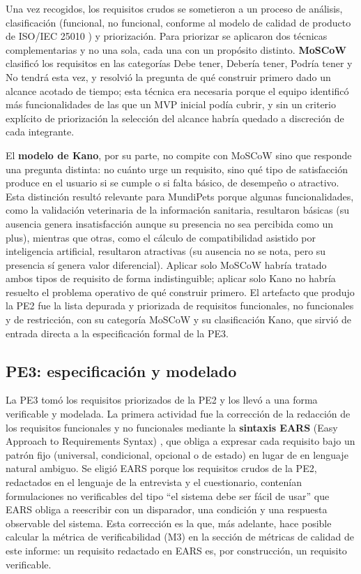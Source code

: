\documentclass[journal,onecolumn]{IEEEtran}
\begin{document}
	Una vez recogidos, los requisitos crudos se sometieron a un proceso de análisis,
	clasificación (funcional, no funcional, conforme al modelo de calidad de producto de
	ISO/IEC 25010 \cite{iso25010}) y priorización. Para priorizar se aplicaron dos técnicas
	complementarias y no una sola, cada una con un propósito distinto. \textbf{MoSCoW}
	clasificó los requisitos en las categorías Debe tener, Debería tener, Podría tener y No
	tendrá esta vez, y resolvió la pregunta de qué construir primero dado un alcance acotado de
	tiempo; esta técnica era necesaria porque el equipo identificó más funcionalidades de las
	que un MVP inicial podía cubrir, y sin un criterio explícito de priorización la selección
	del alcance habría quedado a discreción de cada integrante. 
	
	El \textbf{modelo de Kano}, por
	su parte, no compite con MoSCoW sino que responde una pregunta distinta: no cuánto urge un
	requisito, sino qué tipo de satisfacción produce en el usuario si se cumple o si falta
	básico, de desempeño o atractivo. Esta distinción resultó relevante para MundiPets
	porque algunas funcionalidades, como la validación veterinaria de la información sanitaria,
	resultaron básicas (su ausencia genera insatisfacción aunque su presencia no sea percibida
	como un plus), mientras que otras, como el cálculo de compatibilidad asistido por
	inteligencia artificial, resultaron atractivas (su ausencia no se nota, pero su presencia
	sí genera valor diferencial). Aplicar solo MoSCoW habría tratado ambos tipos de requisito
	de forma indistinguible; aplicar solo Kano no habría resuelto el problema operativo de
	qué construir primero. El artefacto que produjo la PE2 fue la lista depurada y priorizada
	de requisitos funcionales, no funcionales y de restricción, con su categoría MoSCoW y su
	clasificación Kano, que sirvió de entrada directa a la especificación formal de la PE3.
	
	\subsection{PE3: especificación y modelado}
	
	La PE3 tomó los requisitos priorizados de la PE2 y los llevó a una forma verificable y
	modelada. La primera actividad fue la corrección de la redacción de los requisitos
	funcionales y no funcionales mediante la \textbf{sintaxis EARS} (Easy Approach to
	Requirements Syntax) \cite{mavin2009}, que obliga a expresar cada requisito bajo un patrón
	fijo (universal, condicional, opcional o de estado) en lugar de en lenguaje natural
	ambiguo. Se eligió EARS porque los requisitos crudos de la PE2, redactados en el lenguaje
	de la entrevista y el cuestionario, contenían formulaciones no verificables del tipo
	``el sistema debe ser fácil de usar'' que EARS obliga a reescribir con un disparador, una
	condición y una respuesta observable del sistema. Esta corrección es la que, más adelante,
	hace posible calcular la métrica de verificabilidad (M3) en la sección de métricas de
	calidad de este informe: un requisito redactado en EARS es, por construcción, un requisito
	verificable.
	
\end{document}
